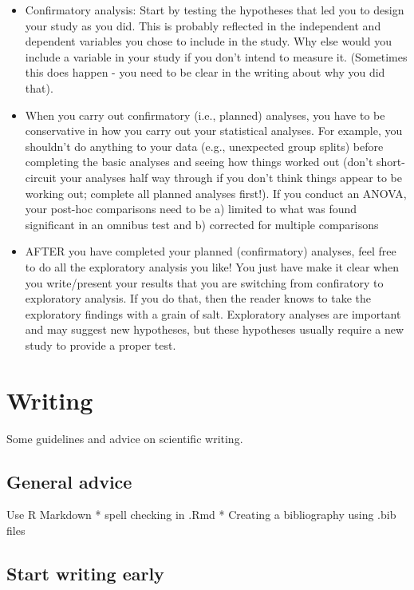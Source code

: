 \documentclass[
]{book}
\providecommand{\tightlist}{%
  \setlength{\itemsep}{0pt}\setlength{\parskip}{0pt}}
\begin{document}
\begin{itemize}
\tightlist
\item
  Confirmatory analysis: Start by testing the hypotheses that led you to design your study as you did. This is probably reflected in the independent and dependent variables you chose to include in the study. Why else would you include a variable in your study if you don't intend to measure it. (Sometimes this does happen - you need to be clear in the writing about why you did that).
\item
  When you carry out confirmatory (i.e., planned) analyses, you have to be conservative in how you carry out your statistical analyses. For example, you shouldn't do anything to your data (e.g., unexpected group splits) before completing the basic analyses and seeing how things worked out (don't short-circuit your analyses half way through if you don't think things appear to be working out; complete all planned analyses first!). If you conduct an ANOVA, your post-hoc comparisons need to be a) limited to what was found significant in an omnibus test and b) corrected for multiple comparisons
\item
  AFTER you have completed your planned (confirmatory) analyses, feel free to do all the exploratory analysis you like! You just have make it clear when you write/present your results that you are switching from confiratory to exploratory analysis. If you do that, then the reader knows to take the exploratory findings with a grain of salt. Exploratory analyses are important and may suggest new hypotheses, but these hypotheses usually require a new study to provide a proper test.
\end{itemize}

\hypertarget{writing}{%
\chapter{Writing}\label{writing}}

Some guidelines and advice on scientific writing.

\hypertarget{general-advice}{%
\section{General advice}\label{general-advice}}

Use R Markdown
* spell checking in .Rmd
* Creating a bibliography using .bib files

\hypertarget{start-writing-early}{%
\section{Start writing early}\label{start-writing-early}}
\end{document}
